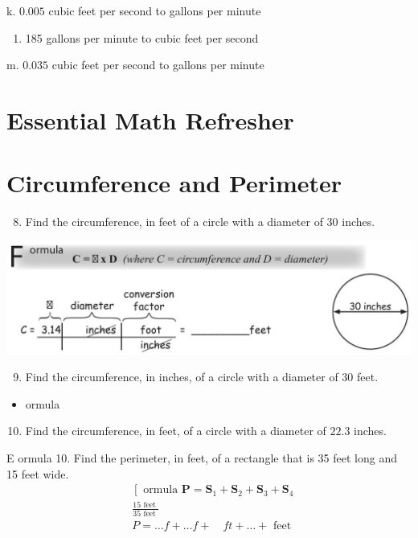 \documentclass[10pt]{article}
\begin{document}
k. $0.005$ cubic feet per second to gallons per minute

\begin{enumerate}
  \item 185 gallons per minute to cubic feet per second
\end{enumerate}
m. $0.035$ cubic feet per second to gallons per minute

\section{Essential Math Refresher}
\section{Circumference and Perimeter}
\begin{enumerate}
  \setcounter{enumi}{7}
  \item Find the circumference, in feet of a circle with a diameter of 30 inches.
\end{enumerate}
\includegraphics[max width=\textwidth]{2022_09_16_4d34b76b97ee13a67df7g-18}

\begin{enumerate}
  \setcounter{enumi}{8}
  \item Find the circumference, in inches, of a circle with a diameter of 30 feet.
\end{enumerate}
\begin{itemize}
  \item ormula
\end{itemize}
\begin{enumerate}
  \setcounter{enumi}{9}
  \item Find the circumference, in feet, of a circle with a diameter of $22.3$ inches.
\end{enumerate}
E ormula 10. Find the perimeter, in feet, of a rectangle that is 35 feet long and 15 feet wide.
$$
\begin{aligned}
& \left[\text { ormula } \mathbf{P}=\mathbf{S}_{1}+\mathbf{S}_{2}+\mathbf{S}_{3}+\mathbf{S}_{4}\right. \\
& \frac{15 \text { feet }}{35 \text { feet }} \\
& P=\ldots f+\ldots f+\quad f t+\ldots+\text { feet }
\end{aligned}
$$
\end{document}
